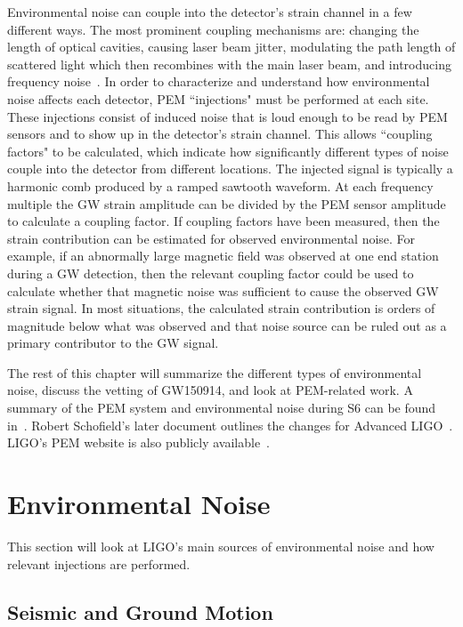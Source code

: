 Environmental noise can couple into the detector's strain channel in a few different ways. The most prominent coupling mechanisms are: changing the length of optical cavities, causing laser beam jitter, modulating the path length of scattered light which then recombines with the main laser beam, and introducing frequency noise~\cite{ana_pem}. In order to characterize and understand how environmental noise affects each detector, PEM ``injections" must be performed at each site. These injections consist of induced noise that is loud enough to be read by PEM sensors and to show up in the detector's strain channel. This allows ``coupling factors" to be calculated, which indicate how significantly different types of noise couple into the detector from different locations. The injected signal is typically a harmonic comb produced by a ramped sawtooth waveform. At each frequency multiple the GW strain amplitude can be divided by the PEM sensor amplitude to calculate a coupling factor. If coupling factors have been measured, then the strain contribution can be estimated for observed environmental noise. For example, if an abnormally large magnetic field was observed at one end station during a GW detection, then the relevant coupling factor could be used to calculate whether that magnetic noise was sufficient to cause the observed GW strain signal. In most situations, the calculated strain contribution is orders of magnitude below what was observed and that noise source can be ruled out as a primary contributor to the GW signal.

The rest of this chapter will summarize the different types of environmental noise, discuss the vetting of GW150914, and look at PEM-related work. A summary of the PEM system and environmental noise during S6 can be found in~\cite{ana_pem}. Robert Schofield's later document outlines the changes for Advanced LIGO~\cite{aLigo_pem}. LIGO's PEM website is also publicly available~\cite{pem_website}.

\section{Environmental Noise}

This section will look at LIGO's main sources of environmental noise and how relevant injections are performed.

\subsection{Seismic and Ground Motion}

